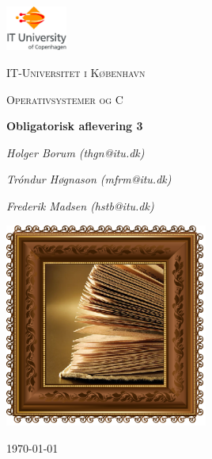 
\begin{titlepage}
	\centering
	\includegraphics[width=0.15\textwidth]{logo}\par\vspace{1cm}
	{\scshape\LARGE IT-Universitet i København \par}
	\vspace{1cm}
	{\scshape\Large Operativsystemer og C\par}
	\vspace{1.5cm}
	{\huge\bfseries Obligatorisk aflevering 3\par}
	\vspace{1cm}
	{\Large\itshape Holger Borum (thgn@itu.dk)\par}
	{\Large\itshape Tróndur Høgnason (mfrm@itu.dk)\par}
	{\Large\itshape Frederik Madsen (hstb@itu.dk)\par}
	\vspace{1 cm}
	\includegraphics[width=0.5\textwidth]{pages}\par\vspace{1cm}
\vspace{\fill}
	{\large \today\par}
\end{titlepage}